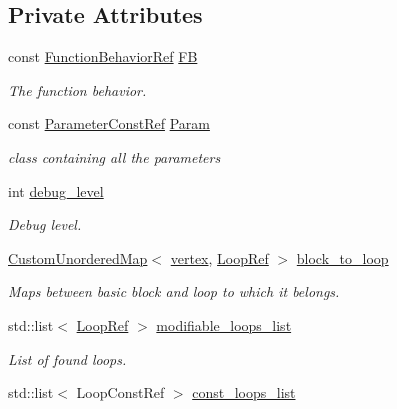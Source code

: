 \subsection*{Private Attributes}
\begin{DoxyCompactItemize}
\item 
const \hyperlink{function__behavior_8hpp_affbc6a46ab86ddfabe31c10986d333dc}{Function\+Behavior\+Ref} \hyperlink{classLoops_ab337d3197422c62eabab4566280e95df}{FB}
\begin{DoxyCompactList}\small\item\em The function behavior. \end{DoxyCompactList}\item 
const \hyperlink{Parameter_8hpp_a37841774a6fcb479b597fdf8955eb4ea}{Parameter\+Const\+Ref} \hyperlink{classLoops_a756be6e3fec1b2c4b9518c6461dc009a}{Param}
\begin{DoxyCompactList}\small\item\em class containing all the parameters \end{DoxyCompactList}\item 
int \hyperlink{classLoops_aa40adf704306582fde6278a4257d1efa}{debug\+\_\+level}
\begin{DoxyCompactList}\small\item\em Debug level. \end{DoxyCompactList}\item 
\hyperlink{custom__map_8hpp_ad1ed68f2ff093683ab1a33522b144adc}{Custom\+Unordered\+Map}$<$ \hyperlink{graph_8hpp_abefdcf0544e601805af44eca032cca14}{vertex}, \hyperlink{loop_8hpp_aa4a60313089619376f67557c4120423c}{Loop\+Ref} $>$ \hyperlink{classLoops_aad1cb53edf1df5649650f1f4d991bf82}{block\+\_\+to\+\_\+loop}
\begin{DoxyCompactList}\small\item\em Maps between basic block and loop to which it belongs. \end{DoxyCompactList}\item 
std\+::list$<$ \hyperlink{loop_8hpp_aa4a60313089619376f67557c4120423c}{Loop\+Ref} $>$ \hyperlink{classLoops_a5c8561d32679c74ff5998df3d7370d2f}{modifiable\+\_\+loops\+\_\+list}
\begin{DoxyCompactList}\small\item\em List of found loops. \end{DoxyCompactList}\item 
std\+::list$<$ Loop\+Const\+Ref $>$ \hyperlink{classLoops_a315b5cb886eb68b60ba20a0e85de97cf}{const\+\_\+loops\+\_\+list}
\end{DoxyCompactItemize}



